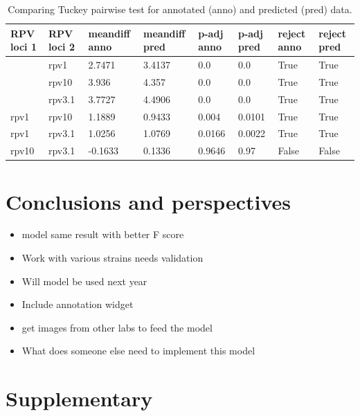 \documentclass[english]{article}
\begin{document}
\begin{table}[H]
    \centering
    \caption{Comparing Tuckey pairwise test for annotated (anno) and predicted (pred) data.}
    \label{tab:tuckey}
    \begin{tabular}{llllllll}
        \toprule
        RPV loci 1 & RPV loci 2 & meandiff anno & meandiff pred & p-adj anno & p-adj pred & reject anno & reject pred \\
        \midrule
                  & rpv1      & 2.7471        & 3.4137        & 0.0        & 0.0        & True        & True        \\
                  & rpv10     & 3.936         & 4.357         & 0.0        & 0.0        & True        & True        \\
                  & rpv3.1    & 3.7727        & 4.4906        & 0.0        & 0.0        & True        & True        \\
        rpv1      & rpv10     & 1.1889        & 0.9433        & 0.004      & 0.0101     & True        & True        \\
        rpv1      & rpv3.1    & 1.0256        & 1.0769        & 0.0166     & 0.0022     & True        & True        \\
        rpv10     & rpv3.1    & -0.1633       & 0.1336        & 0.9646     & 0.97       & False       & False       \\
        \bottomrule
    \end{tabular}
\end{table}

\section{Conclusions and perspectives}

\begin{itemize}
    \item model same result with better F score
    \item Work with various strains needs validation
    \item Will model be used next year
    \item Include annotation widget
    \item get images from other labs to feed the model
    \item What does someone else need to implement this model
\end{itemize}

\section{Supplementary}
\end{document}
